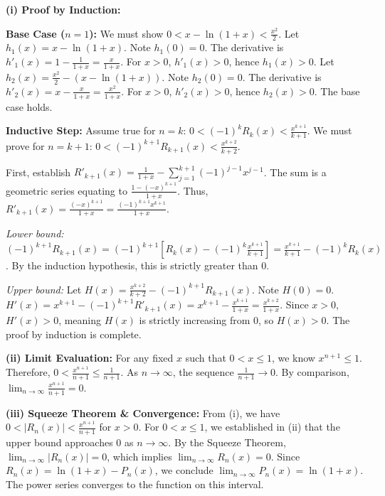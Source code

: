 \begin{solution}
\textbf{(i) Proof by Induction:}

\textbf{Base Case ($n=1$):} We must show $0 < x - \ln(1+x) < \frac{x^2}{2}$.
Let $h_1(x) = x - \ln(1+x)$. Note $h_1(0) = 0$. The derivative is $h'_1(x) = 1 - \frac{1}{1+x} = \frac{x}{1+x}$. For $x > 0$, $h'_1(x) > 0$, hence $h_1(x) > 0$.
Let $h_2(x) = \frac{x^2}{2} - (x - \ln(1+x))$. Note $h_2(0) = 0$. The derivative is $h'_2(x) = x - \frac{x}{1+x} = \frac{x^2}{1+x}$. For $x > 0$, $h'_2(x) > 0$, hence $h_2(x) > 0$. The base case holds.

\textbf{Inductive Step:} Assume true for $n = k$: $0 < (-1)^k R_k(x) < \frac{x^{k+1}}{k+1}$.
We must prove for $n = k+1$: $0 < (-1)^{k+1} R_{k+1}(x) < \frac{x^{k+2}}{k+2}$.

First, establish $R'_{k+1}(x) = \frac{1}{1+x} - \sum_{j=1}^{k+1} (-1)^{j-1} x^{j-1}$. The sum is a geometric series equating to $\frac{1 - (-x)^{k+1}}{1+x}$. Thus, $R'_{k+1}(x) = \frac{(-x)^{k+1}}{1+x} = \frac{(-1)^{k+1} x^{k+1}}{1+x}$.

\textit{Lower bound:} $(-1)^{k+1} R_{k+1}(x) = (-1)^{k+1} \left[R_k(x) - (-1)^k \frac{x^{k+1}}{k+1}\right] = \frac{x^{k+1}}{k+1} - (-1)^k R_k(x)$. By the induction hypothesis, this is strictly greater than 0.

\textit{Upper bound:} Let $H(x) = \frac{x^{k+2}}{k+2} - (-1)^{k+1} R_{k+1}(x)$. Note $H(0) = 0$.
$H'(x) = x^{k+1} - (-1)^{k+1} R'_{k+1}(x) = x^{k+1} - \frac{x^{k+1}}{1+x} = \frac{x^{k+2}}{1+x}$.
Since $x > 0$, $H'(x) > 0$, meaning $H(x)$ is strictly increasing from 0, so $H(x) > 0$. The proof by induction is complete.

\textbf{(ii) Limit Evaluation:}
For any fixed $x$ such that $0 < x \le 1$, we know $x^{n+1} \le 1$.
Therefore, $0 < \frac{x^{n+1}}{n+1} \le \frac{1}{n+1}$.
As $n \to \infty$, the sequence $\frac{1}{n+1} \to 0$. By comparison, $\lim_{n \to \infty} \frac{x^{n+1}}{n+1} = 0$.

\textbf{(iii) Squeeze Theorem \& Convergence:}
From (i), we have $0 < |R_n(x)| < \frac{x^{n+1}}{n+1}$ for $x > 0$.
For $0 < x \le 1$, we established in (ii) that the upper bound approaches 0 as $n \to \infty$.
By the Squeeze Theorem, $\lim_{n \to \infty} |R_n(x)| = 0$, which implies $\lim_{n \to \infty} R_n(x) = 0$.
Since $R_n(x) = \ln(1+x) - P_n(x)$, we conclude $\lim_{n \to \infty} P_n(x) = \ln(1+x)$. The power series converges to the function on this interval.
\end{solution}

